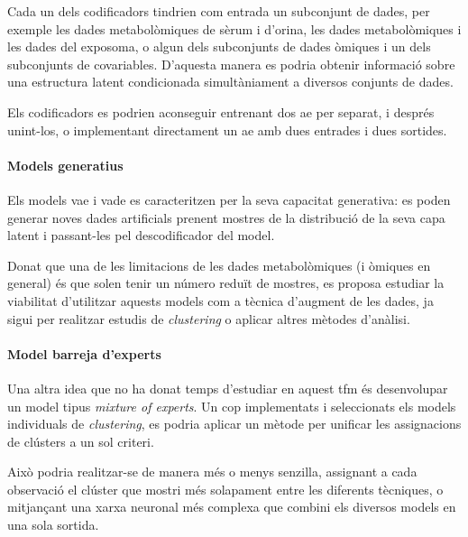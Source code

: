 \documentclass[CAT,BIB]{TFUOC}%
\begin{document}
            Cada un dels codificadors tindrien com entrada un subconjunt de dades,
            per exemple les dades metabolòmiques de sèrum i d'orina,
            les dades metabolòmiques i les dades del exposoma,
            o algun dels subconjunts de dades òmiques i un dels subconjunts de covariables.
            D'aquesta manera es podria obtenir informació sobre una estructura latent
            condicionada simultàniament a diversos conjunts de dades.

            Els codificadors es podrien aconseguir entrenant dos \gls{ae} per separat,
            i després unint-los,
            o implementant directament un \gls{ae} amb dues entrades i dues sortides.

        \paragraph{Models generatius}
            Els models \gls{vae} i \gls{vade} es caracteritzen
            per la seva capacitat generativa:
            es poden generar noves dades artificials
            prenent mostres de la distribució de la seva capa latent
            i passant-les pel descodificador del model.

            Donat que una de les limitacions de les dades metabolòmiques
            (i òmiques en general)
            és que solen tenir un número reduït de mostres,
            es proposa estudiar la viabilitat d'utilitzar aquests models
            com a tècnica d'augment de les dades,
            ja sigui per realitzar estudis de \textit{clustering}
            o aplicar altres mètodes d'anàlisi.

        \paragraph{Model barreja d'experts}
            Una altra idea que no ha donat temps d'estudiar en aquest \gls{tfm}
            és desenvolupar un model tipus \textit{mixture of experts}.
            Un cop implementats i seleccionats els models individuals de \textit{clustering},
            es podria aplicar un mètode per unificar les assignacions
            de clústers a un sol criteri.

            Això podria realitzar-se de manera més o menys senzilla,
            assignant a cada observació el clúster que mostri més solapament
            entre les diferents tècniques,
            o mitjançant una xarxa neuronal més complexa
            que combini els diversos models en una sola sortida.
\end{document}
